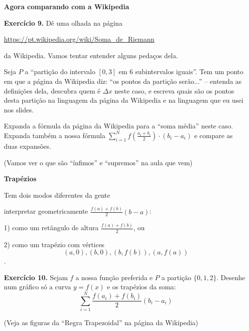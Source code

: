 \documentclass[oneside,12pt]{article}
\begin{document}
{\bf Agora comparando com a Wikipedia}

\msk

{\bf Exercício 9.} Dê uma olhada na página

\ssk

\url{https://pt.wikipedia.org/wiki/Soma_de_Riemann}

\ssk

da Wikipedia. Vamos tentar entender alguns pedaços dela.

Seja $P$ a ``partição do intervalo $[0,3]$ em 6 subintervalos
iguais''. Tem um ponto em que a página da Wikipedia diz: ``os pontos
da partição serão...'' -- entenda as definições dela, descubra quem é
$Δx$ neste caso, e escreva quais são os pontos desta partição na
linguagem da página da Wikipedia e na linguagem que eu usei nos slides.

Expanda a fórmula da página da Wikipedia para a ``soma média'' neste
caso. Expanda também a nossa fórmula $\sum_{i=1}^N
f(\frac{a_i+b_i}{2})·(b_i-a_i)$ e compare as duas expansões.

\msk

(Vamos ver o que são ``ínfimos'' e ``supremos'' na aula que vem)

\newpage


{\bf Trapézios}

Tem dois modos diferentes da gente

interpretar geometricamente $\frac{f(a)+f(b)}{2} (b-a)$:

\msk

1) como um retângulo de altura $\frac{f(a)+f(b)}{2}$, ou

2) como um trapézio com vértices
%
$$(a,0), (b,0), (b,f(b)), (a,f(a))$$.

{\bf Exercício 10.} Sejam $f$ a nossa função preferida e $P$ a
partição $\{0,1,2\}$. Desenhe num gráfico só a curva $y=f(x)$ e os
trapézios da soma:
%
$$\sum_{i=1}^N \frac{f(a_i)+f(b_i)}{2} (b_i-a_i)$$

(Veja as figuras da ``Regra Trapezoidal'' na página da Wikipedia)



\newpage


\end{document}
